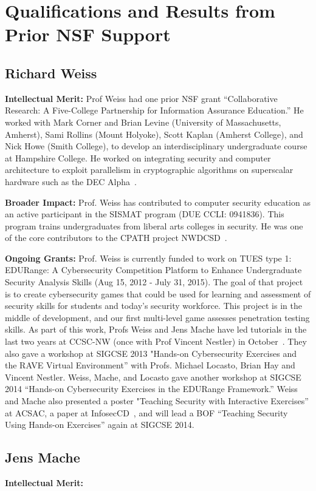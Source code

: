 
\section{Qualifications and Results from Prior NSF Support}

\subsection{Richard Weiss}

{\bf Intellectual Merit:}
Prof Weiss had one prior NSF grant ``Collaborative Research: A Five-College Partnership for 
Information Assurance Education.''  He
worked with Mark Corner and Brian Levine 
(University of Massachusetts, Amherst),
Sami Rollins (Mount Holyoke), Scott Kaplan (Amherst College), and 
Nick Howe (Smith College), to develop an interdisciplinary undergraduate course at Hampshire College.
He worked on integrating security and computer architecture to exploit parallelism in 
cryptographic algorithms on superscalar hardware such as the DEC Alpha~\cite{rw:AES_2000}.


{\bf Broader Impact:}
Prof. Weiss has contributed to computer security education as an active participant in the 
SISMAT program (DUE CCLI: 0941836).  This program trains undergraduates from liberal arts colleges
in security. He was one of the core contributors to the CPATH project NWDCSD~\cite{NWDCSD}.

{\bf Ongoing Grants:}
Prof. Weiss is currently funded to work on TUES type 1: EDURange: A Cybersecurity Competition Platform to 
Enhance Undergraduate Security Analysis Skills (Aug 15, 2012 - July 31, 2015).
The goal of that project is to create cybersecurity games that could be used for learning and
assessment of security skills for students and today's security workforce.  This project is in
the middle of development, and our first multi-level 
game assesses penetration testing skills.  As part of this work,
Profs Weiss and Jens Mache have led tutorials in the last two years at CCSC-NW 
(once with Prof Vincent Nestler) 
in October~\cite{rw_jm:CCSC_2012,rw_jm:CCSC_2013}.
 They  also gave
a workshop at SIGCSE 2013 "Hands-on Cybersecurity Exercises and the RAVE Virtual Environment''
with Profs. Michael Locasto, Brian Hay and Vincent Nestler. Weiss, Mache, and Locasto gave another
workshop at SIGCSE 2014 ``Hands-on Cybersecurity Exercises in the EDURange Framework.'' 
 Weiss and Mache also presented a poster "Teaching Security with Interactive Exercises'' at 
ACSAC\cite{rw_jm:ACSAC_2012}, 
a paper %
at InfosecCD~\cite{rw_jm:infosecCD_2012}, and 
will lead a BOF 
``Teaching Security Using Hands-on Exercises'' again at SIGCSE 2014. 

\subsection{Jens Mache}
{\bf Intellectual Merit:}
